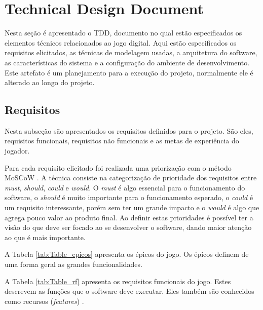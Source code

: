


\section{Technical Design Document}
\label{sec:tdd}
Nesta seção é apresentado o TDD, documento no qual estão especificados os elementos técnicos relacionados ao jogo digital. Aqui estão especificados os requisitos elicitados, as técnicas de modelagem usadas, a arquitetura do software, as características do sistema e a configuração do ambiente de desenvolvimento. Este artefato é um planejamento para a execução do projeto, normalmente ele é alterado ao longo do projeto.

\subsection{Requisitos}
\label{ssec:requisitos}

Nesta subseção são apresentados os requisitos definidos para o projeto. São eles, requisitos funcionais, requisitos não funcionais e as metas de experiência do jogador. 

{\color{textadded}
Para cada requisito elicitado foi realizada uma priorização com o método MoSCoW \cite{waters2009prioritization}. A técnica consiste na categorização de prioridade dos requisitos entre \textit{must}, \textit{should}, \textit{could} e \textit{would}. O \textit{must} é algo essencial para o funcionamento do software, o \textit{should} é muito importante para o funcionamento esperado, o \textit{could} é um requisito interessante, porém sem ter um grande impacto e o \textit{would} é algo que agrega pouco valor ao produto final. Ao definir estas prioridades é possível ter a visão do que deve ser focado ao se desenvolver o software, dando maior atenção ao que é mais importante.
}

{\color{textadded}
A Tabela \ref{tab:Table_epicos} apresenta os épicos do jogo. Os épicos definem de uma forma geral as grandes funcionalidades.
}



A Tabela \ref{tab:Table_rf} apresenta os requisitos funcionais do jogo. Estes descrevem as funções que o software deve executar. Eles também são conhecidos como recursos (\textit{features}) \cite{Bourque_2014}. 

